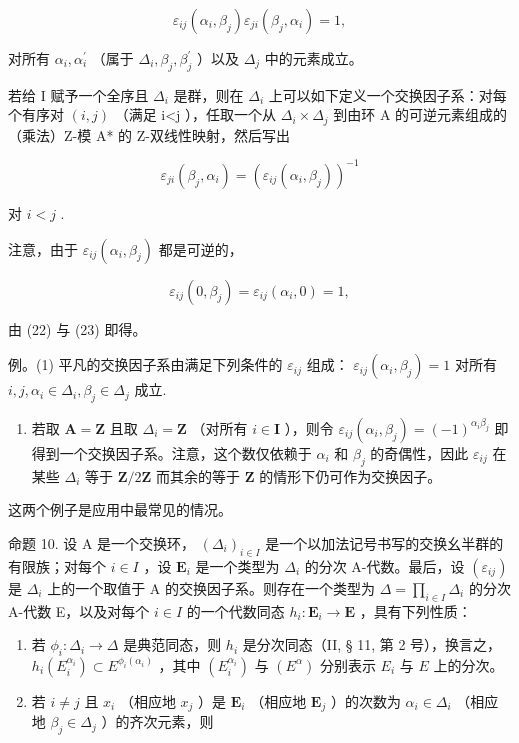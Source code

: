 \[
\varepsilon_ {i j} (\alpha_ {i}, \beta_ {j}) \varepsilon_ {j i} (\beta_ {j}, \alpha_ {i}) = 1,\tag{24}
\]

对所有 \(\alpha_{i},\alpha_{i}^{\prime}\) （属于 \(\Delta_{i},\beta_{j},\beta_{j}^{\prime}\) ）以及 \(\Delta_j\) 中的元素成立。

若给 I 赋予一个全序且 \(\Delta_{i}\) 是群，则在 \(\Delta_{i}\) 上可以如下定义一个交换因子系：对每个有序对 \((i,j)\) （满足 i\textless j ），任取一个从 \(\Delta_{i}\times\Delta_{j}\) 到由环 A 的可逆元素组成的（乘法）Z-模 A* 的 Z-双线性映射，然后写出

\[
\varepsilon_ {j i} (\beta_ {j}, \alpha_ {i}) = (\varepsilon_ {i j} (\alpha_ {i}, \beta_ {j})) ^ {- 1}
\]

对 \(i < j\) .

注意，由于 \(\varepsilon_{ij}(\alpha_{i},\beta_{j})\) 都是可逆的，

\[
\varepsilon_ {i j} (0, \beta_ {j}) = \varepsilon_ {i j} (\alpha_ {i}, 0) = 1,
\]

由 (22) 与 (23) 即得。

例。(1) 平凡的交换因子系由满足下列条件的 \(\varepsilon_{ij}\) 组成： \(\varepsilon_{ij}(\alpha_i, \beta_j) = 1\) 对所有 \(i, j, \alpha_i \in \Delta_i, \beta_j \in \Delta_j\) 成立.

\begin{enumerate}
\def\labelenumi{(\arabic{enumi})}
\setcounter{enumi}{1}
\tightlist
\item
  若取 \(\mathbf{A} = \mathbf{Z}\) 且取 \(\Delta_{i} = \mathbf{Z}\) （对所有 \(i \in \mathbf{I}\) ），则令 \(\varepsilon_{ij}(\alpha_i, \beta_j) = (-1)^{\alpha_i\beta_j}\) 即得到一个交换因子系。注意，这个数仅依赖于 \(\alpha_{i}\) 和 \(\beta_{j}\) 的奇偶性，因此 \(\varepsilon_{ij}\) 在某些 \(\Delta_{i}\) 等于 \(\mathbf{Z}/2\mathbf{Z}\) 而其余的等于 \(\mathbf{Z}\) 的情形下仍可作为交换因子。
\end{enumerate}

这两个例子是应用中最常见的情况。

命题 10. 设 A 是一个交换环， \((\Delta_{i})_{i\in I}\) 是一个以加法记号书写的交换幺半群的有限族；对每个 \(i\in I\) ，设 \(\mathbf{E}_i\) 是一个类型为 \(\Delta_i\) 的分次 A-代数。最后，设 \((\varepsilon_{ij})\) 是 \(\Delta_i\) 上的一个取值于 A 的交换因子系。则存在一个类型为 \(\Delta = \prod_{i\in I}\Delta_i\) 的分次 A-代数 E，以及对每个 \(i\in I\) 的一个代数同态 \(h_i:\mathbf{E}_i\to \mathbf{E}\) ，具有下列性质：

\begin{enumerate}
\def\labelenumi{(\roman{enumi})}
\item
  若 \(\phi_{i}:\Delta_{i}\to\Delta\) 是典范同态，则 \(h_{i}\) 是分次同态（II, § 11, 第 2 号），换言之， \(h_{i}(E_{i}^{\alpha_{i}})\subset E^{\phi_{i}(\alpha_{i})}\) ，其中 \((E_{i}^{\alpha_{i}})\) 与 \((E^{\alpha})\) 分别表示 \(E_{i}\) 与 \(E\) 上的分次。
\item
  若 \(i \neq j\) 且 \(x_{i}\) （相应地 \(x_{j}\) ）是 \(\mathbf{E}_i\) （相应地 \(\mathbf{E}_j\) ）的次数为 \(\alpha_i \in \Delta_i\) （相应地 \(\beta_j \in \Delta_j\) ）的齐次元素，则
\end{enumerate}

